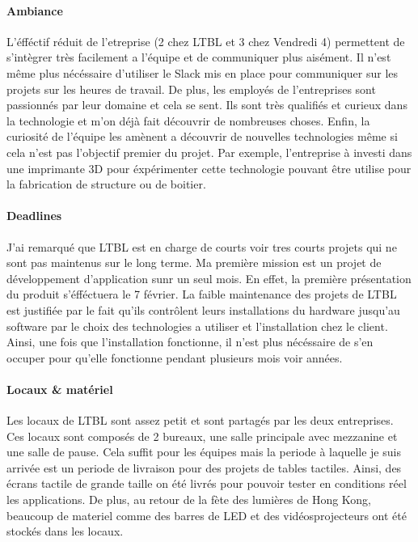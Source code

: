 \documentclass{article}
\begin{document}
\paragraph{Ambiance} L'éfféctif réduit de l'etreprise (2 chez LTBL et 3 chez Vendredi 4) permettent de s'intègrer très facilement a l'équipe et de communiquer plus aisément.
Il n'est même plus nécéssaire d'utiliser le Slack mis en place pour communiquer sur les projets sur les heures de travail.
De plus, les employés de l'entreprises sont passionnés par leur domaine et cela se sent.
Ils sont très qualifiés et curieux dans la technologie et m'on déjà fait découvrir de nombreuses choses.
Enfin, la curiosité de l'équipe les amènent a découvrir de nouvelles technologies même si cela n'est pas l'objectif premier du projet.
Par exemple, l'entreprise à investi dans une imprimante 3D pour éxpérimenter cette technologie pouvant être utilise pour la fabrication de structure ou de boitier.

\paragraph{Deadlines} J'ai remarqué que LTBL est en charge de courts voir tres courts projets qui ne sont pas maintenus sur le long terme.
Ma première mission est un projet de développement d'application sunr un seul mois.
En effet, la première présentation du produit s'éfféctuera le 7 février.
La faible maintenance des projets de LTBL est justifiée par le fait qu'ils contrôlent leurs installations du hardware jusqu'au software par le choix des technologies a utiliser et l'installation chez le client.
Ainsi, une fois que l'installation fonctionne, il n'est plus nécéssaire de s'en occuper pour qu'elle fonctionne pendant plusieurs mois voir années.

\paragraph{Locaux \& matériel} Les locaux de LTBL sont assez petit et sont partagés par les deux entreprises.
Ces locaux sont composés de 2 bureaux, une salle principale avec mezzanine et une salle de pause.
Cela suffit pour les équipes mais la periode à laquelle je suis arrivée est un periode de livraison pour des projets de tables tactiles.
Ainsi, des écrans tactile de grande taille on été livrés pour pouvoir tester en conditions réel les applications.
De plus, au retour de la fète des lumières de Hong Kong, beaucoup de materiel comme des barres de LED et des vidéosprojecteurs ont été stockés dans les locaux.
\end{document}
